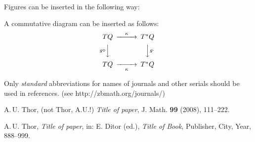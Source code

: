 \documentclass[a4paper,draft]{amsproc}
\theoremstyle{plain}
\theoremstyle{definition}
\theoremstyle{remark}
\numberwithin{equation}{section}
\begin{document}
Figures can be inserted in the following way:

\begin{figure}[htb]
\caption{}
\label{some label}
\end{figure}

A commutative diagram can be inserted as follows:
\[
\begin{CD}
TQ @>{\kappa}>> T^*Q \\
@V{g\diamond}VV  @VV{g\cdot}V \\
TQ @>>{\kappa}> T^*Q \\
\end{CD}
\]

Only \emph{standard} abbreviations for names of journals and other serials 
should be used in references. (see http://zbmath.org/journals/)



\begin{thebibliography}{n} %

\label{some label - optional} A.\,U. Thor, (not Thor, A.U.!)
\emph{Title of paper},
J. Math. \textbf{99} (2008), 111--222.

 A.\,U. Thor,
\emph{Title of paper},
in: E. Ditor (ed.), \emph{Title of Book}, Publisher, City, Year, 888--999.

\end{thebibliography}
\end{document}
